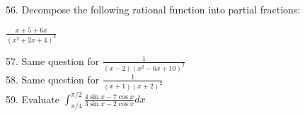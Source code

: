 \documentclass[11pt]{amsbook}
\begin{document}
56. Decompose the following rational function into partial fractions:

\begin{center}
	$ \frac{x+{5} + 6x}{(x^{2} + 2x + 4)^{3}} $ \\[.1in]
\end{center}

57. Same question for $ \frac{1}{(x - 2)(x^{2} - 6x + 10)^{2}} $ \\[.1in]

58. Same question for $ \frac{1}{(x + 1)(x + 2)^{2}} $ \\[.1in]

59. Evaluate $ \int_{\pi/4}^{\pi/2} \frac{4\sin{x} - 7\cos{x}}{3\sin{x} - 2\cos{x}} dx $ \\[.1in]
\end{document}
